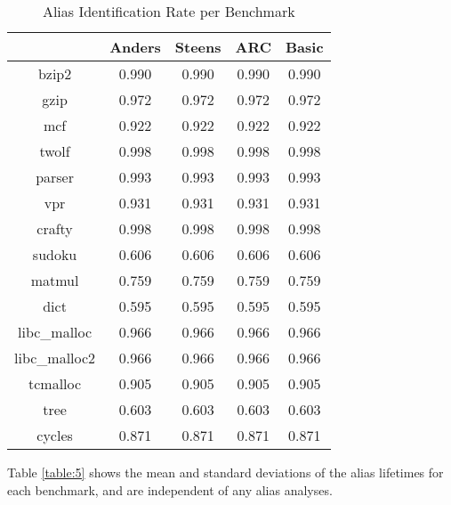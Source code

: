 \begin{table} [h!]
\centering
   \begin{tabular} {|c|c c c c|}
      \hline
      & Anders & Steens & ARC & Basic \\
      \hline
	   bzip2 & 0.990 & 0.990 & 0.990 & 0.990 \\
      \hline
	   gzip & 0.972 & 0.972 & 0.972 & 0.972 \\
      \hline
           mcf & 0.922 & 0.922 & 0.922 & 0.922 \\
      \hline
	   twolf & 0.998 & 0.998 & 0.998 & 0.998 \\
      \hline
	   parser & 0.993 & 0.993 & 0.993 & 0.993 \\
      \hline
	   vpr & 0.931 & 0.931 & 0.931 & 0.931 \\
      \hline
	   crafty & 0.998 & 0.998 & 0.998 & 0.998 \\
      \hline
	   sudoku & 0.606 & 0.606 & 0.606 & 0.606 \\
      \hline
	   matmul & 0.759 & 0.759 & 0.759 & 0.759 \\
      \hline
	   dict & 0.595 & 0.595 & 0.595 & 0.595 \\
      \hline
	   libc\_malloc & 0.966 & 0.966 & 0.966 & 0.966 \\
      \hline
	   libc\_malloc2 & 0.966 & 0.966 & 0.966 & 0.966 \\
      \hline
	   tcmalloc & 0.905 & 0.905 & 0.905 & 0.905 \\
      \hline
	   tree & 0.603 & 0.603 & 0.603 & 0.603 \\
      \hline
	   cycles & 0.871 & 0.871 & 0.871 & 0.871 \\
      \hline
   \end{tabular}
   \caption{Alias Identification Rate per Benchmark}
   \label{table:4}
\end{table}

\newpage

Table \ref{table:5} shows the mean and standard deviations of the alias lifetimes for each benchmark, and are independent of any alias analyses.

